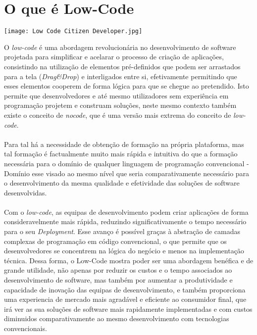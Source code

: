 \documentclass[pdflatex,sn-mathphys-num]{sn-jnl}
\theoremstyle{thmstyleone}
\theoremstyle{thmstyletwo}
\theoremstyle{thmstylethree}
\begin{document}
\section{O que é Low-Code}\label{sec2}

\begin{center}
\texttt{[image: Low Code Citizen Developer.jpg]}
\end{center}


O \textit{low-code} é uma abordagem revolucionária no desenvolvimento de software projetada para simplificar e acelarar o processo de criação de aplicações, consistindo na utilização de elementos pré-definidos que podem ser arrastados para a tela (\textit{Drag\&Drop}) e interligados entre si, efetivamente permitindo que esses elementos cooperem de forma lógica para que se chegue ao pretendido. Isto permite que desenvolvedores e até mesmo utilizadores sem experiência em programação projetem e construam soluções, neste mesmo contexto também existe o conceito de \textit{nocode}, que é uma versão mais extrema do conceito de \textit{low-code}.\cite{bib4}

\paragraph{} Para tal há a necessidade de obtenção de formação na própria plataforma, mas tal formação é factualmente muito mais rápida e intuitiva do que a formação necessária para o domínio de qualquer linguagem de programação convencional -  Domínio esse visado ao mesmo nível que seria comparativamente necessário para o desenvolvimento da mesma qualidade e efetividade das soluções de software desenvolvidas. \cite{bib4}

\paragraph{} Com o \textit{low-code}, as equipas de desenvolvimento podem criar aplicações de forma consideravelmente mais rápida, reduzindo significativamente o tempo necessário para o seu \textit{Deployment}. Esse avanço é possível graças à abstração de camadas complexas de programação em código convencional, o que permite que os desenvolvedores se concentrem na lógica  do negócio e menos na implementação técnica. Dessa forma, o Low-Code mostra poder ser uma abordagem benéfica e de grande utilidade, não apenas por reduzir os custos e o tempo associados ao desenvolvimento de software, mas também por aumentar a produtividade e capacidade de inovação das equipas de desenvolvimento, e também proporciona uma experiencia de mercado mais agradável e eficiente ao consumidor final, que irá ver as sua soluções de software mais rapidamente implementadas e com custos diminuidos comparativamente ao mesmo desenvolvimento com tecnologias convencionais. \cite{bib6}
\end{document}
